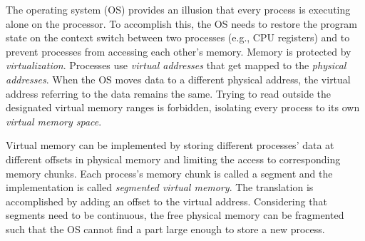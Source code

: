 
The operating system (OS) provides an illusion that every process is executing
alone on the processor. To accomplish this, the OS needs to restore the program
state on the context switch between two processes (e.g., CPU registers) and to
prevent processes from accessing each other's memory. Memory is protected by
\emph{virtualization}. Processes use \emph{virtual addresses} that get mapped to
the \emph{physical addresses}. When the OS moves data to a different physical
address, the virtual address referring to the data remains the same. Trying to
read outside the designated virtual memory ranges is forbidden, isolating every
process to its own \emph{virtual memory space}.

Virtual memory can be implemented by storing different processes' data at 
different offsets in physical memory and limiting the access to corresponding 
memory chunks. Each process's memory chunk is called a segment and the 
implementation is called \emph{segmented virtual memory}. The translation is 
accomplished by adding an offset to the virtual address. Considering that 
segments need to be continuous, the free physical memory can be fragmented
such that the OS cannot find a part large enough to store a new process.

